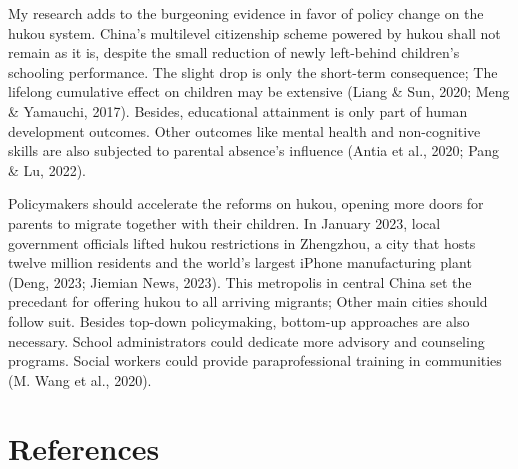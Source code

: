\documentclass[
  man,floatsintext]{apa7}
\begin{document}
My research adds to the burgeoning evidence in favor of policy change on the hukou system. China's multilevel citizenship scheme powered by hukou shall not remain as it is, despite the small reduction of newly left-behind children's schooling performance. The slight drop is only the short-term consequence; The lifelong cumulative effect on children may be extensive (Liang \& Sun, 2020; Meng \& Yamauchi, 2017). Besides, educational attainment is only part of human development outcomes. Other outcomes like mental health and non-cognitive skills are also subjected to parental absence's influence (Antia et al., 2020; Pang \& Lu, 2022).

Policymakers should accelerate the reforms on hukou, opening more doors for parents to migrate together with their children. In January 2023, local government officials lifted hukou restrictions in Zhengzhou, a city that hosts twelve million residents and the world's largest iPhone manufacturing plant (Deng, 2023; Jiemian News, 2023). This metropolis in central China set the precedant for offering hukou to all arriving migrants; Other main cities should follow suit. Besides top-down policymaking, bottom-up approaches are also necessary. School administrators could dedicate more advisory and counseling programs. Social workers could provide paraprofessional training in communities (M. Wang et al., 2020).

\newpage

\hypertarget{references}{%
\section{References}\label{references}}
\end{document}
